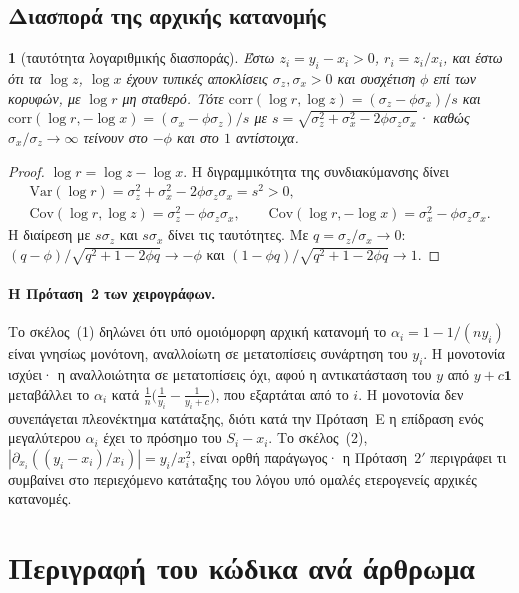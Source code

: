 \documentclass[11pt,a4paper]{article}
\theoremstyle{definition}
\theoremstyle{plain}
\newcommand{\genpropname}{}
\newtheorem*{genprop}{\genpropname}
\newenvironment{prop}[1]{\renewcommand{\genpropname}{Πρόταση #1}\begin{genprop}}{\end{genprop}}
\newcommand{\one}{\mathbf{1}}
\begin{document}
\subsection{Διασπορά της αρχικής κατανομής}

\begin{prop}{$2'$}[ταυτότητα λογαριθμικής διασποράς]
Έστω $z_i=y_i-x_i>0$, $r_i=z_i/x_i$, και έστω ότι τα $\log z$, $\log x$ έχουν τυπικές αποκλίσεις $\sigma_z,\sigma_x>0$ και συσχέτιση $\phi$ επί των κορυφών, με $\log r$ μη σταθερό. Τότε $\mathrm{corr}(\log r,\log z)=(\sigma_z-\phi\sigma_x)/s$ και $\mathrm{corr}(\log r,-\log x)=(\sigma_x-\phi\sigma_z)/s$ με $s=\sqrt{\sigma_z^2+\sigma_x^2-2\phi\sigma_z\sigma_x}$· καθώς $\sigma_x/\sigma_z\to\infty$ τείνουν στο $-\phi$ και στο $1$ αντίστοιχα.
\end{prop}

\begin{proof}
$\log r=\log z-\log x$. Η διγραμμικότητα της συνδιακύμανσης δίνει
\begin{gather*}
\mathrm{Var}(\log r)=\sigma_z^2+\sigma_x^2-2\phi\sigma_z\sigma_x=s^2>0,\\
\mathrm{Cov}(\log r,\log z)=\sigma_z^2-\phi\sigma_z\sigma_x,\qquad
\mathrm{Cov}(\log r,-\log x)=\sigma_x^2-\phi\sigma_z\sigma_x.
\end{gather*}
Η διαίρεση με $s\sigma_z$ και $s\sigma_x$ δίνει τις ταυτότητες. Με $q=\sigma_z/\sigma_x\to0$: $(q-\phi)/\sqrt{q^2+1-2\phi q}\to-\phi$ και $(1-\phi q)/\sqrt{q^2+1-2\phi q}\to1$.
\end{proof}

\paragraph{Η Πρόταση~2 των χειρογράφων.} Το σκέλος~(1) δηλώνει ότι υπό ομοιόμορφη αρχική κατανομή το $\alpha_i=1-1/(ny_i)$ είναι γνησίως μονότονη, αναλλοίωτη σε μετατοπίσεις συνάρτηση του $y_i$. Η μονοτονία ισχύει· η αναλλοιώτητα σε μετατοπίσεις όχι, αφού η αντικατάσταση του $y$ από $y+c\one$ μεταβάλλει το $\alpha_i$ κατά $\frac1n\big(\frac1{y_i}-\frac1{y_i+c}\big)$, που εξαρτάται από το $i$. Η μονοτονία δεν συνεπάγεται πλεονέκτημα κατάταξης, διότι κατά την Πρόταση~E η επίδραση ενός μεγαλύτερου $\alpha_i$ έχει το πρόσημο του $S_i-x_i$. Το σκέλος~(2), $|\partial_{x_i}((y_i-x_i)/x_i)|=y_i/x_i^2$, είναι ορθή παράγωγος· η Πρόταση~$2'$ περιγράφει τι συμβαίνει στο περιεχόμενο κατάταξης του λόγου υπό ομαλές ετερογενείς αρχικές κατανομές.

\section{Περιγραφή του κώδικα ανά άρθρωμα}\label{sec:modules}
\end{document}
